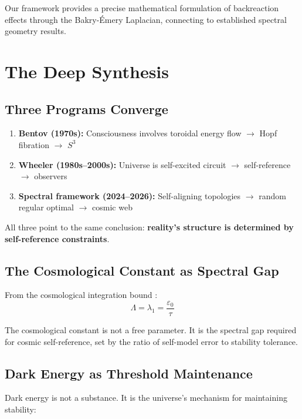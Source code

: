 \documentclass[11pt,a4paper]{article}
\theoremstyle{plain}
\theoremstyle{definition}
\theoremstyle{remark}
\begin{document}
Our framework provides a precise mathematical formulation of backreaction effects through the Bakry-\'{E}mery Laplacian, connecting to established spectral geometry results.

\section{The Deep Synthesis}

\subsection{Three Programs Converge}

\begin{enumerate}[noitemsep]
    \item \textbf{Bentov (1970s):} Consciousness involves toroidal energy flow $\to$ Hopf fibration $\to$ $S^3$
    \item \textbf{Wheeler (1980s--2000s):} Universe is self-excited circuit $\to$ self-reference $\to$ observers
    \item \textbf{Spectral framework (2024--2026):} Self-aligning topologies $\to$ random regular optimal $\to$ cosmic web
\end{enumerate}

All three point to the same conclusion: \textbf{reality's structure is determined by self-reference constraints}.

\subsection{The Cosmological Constant as Spectral Gap}

From the cosmological integration bound \cite{cib}:
\[
\Lambda = \lambda_1 = \frac{\varepsilon_0}{\tau}
\]

The cosmological constant is not a free parameter. It is the spectral gap required for cosmic self-reference, set by the ratio of self-model error to stability tolerance.

\subsection{Dark Energy as Threshold Maintenance}

Dark energy is not a substance. It is the universe's mechanism for maintaining stability:
\end{document}
